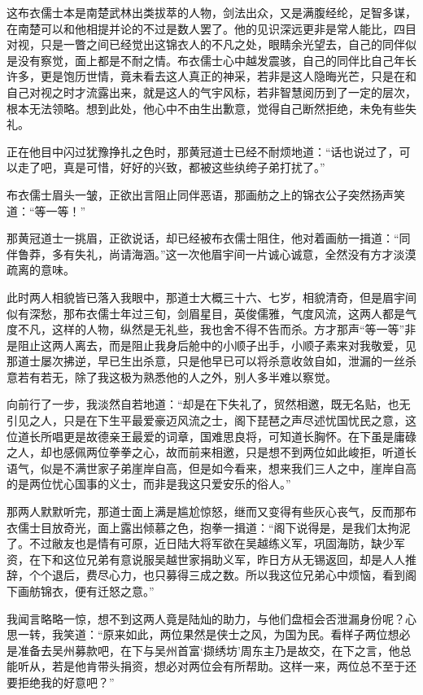 这布衣儒士本是南楚武林出类拔萃的人物，剑法出众，又是满腹经纶，足智多谋，在南楚可以和他相提并论的不过是数人罢了。他的见识深远更非是常人能比，四目对视，只是一瞥之间已经觉出这锦衣人的不凡之处，眼睛余光望去，自己的同伴似是没有察觉，面上都是不耐之情。布衣儒士心中越发震骇，自己的同伴比自己年长许多，更是饱历世情，竟未看去这人真正的神采，若非是这人隐晦光芒，只是在和自己对视之时才流露出来，就是这人的气宇风标，若非智慧阅历到了一定的层次，根本无法领略。想到此处，他心中不由生出歉意，觉得自己断然拒绝，未免有些失礼。

正在他目中闪过犹豫挣扎之色时，那黄冠道士已经不耐烦地道：“话也说过了，可以走了吧，真是可惜，好好的兴致，都被这些纨绔子弟打扰了。”

布衣儒士眉头一皱，正欲出言阻止同伴恶语，那画舫之上的锦衣公子突然扬声笑道：“等一等！”

那黄冠道士一挑眉，正欲说话，却已经被布衣儒士阻住，他对着画舫一揖道：“同伴鲁莽，多有失礼，尚请海涵。”这一次他眉宇间一片诚心诚意，全然没有方才淡漠疏离的意味。

此时两人相貌皆已落入我眼中，那道士大概三十六、七岁，相貌清奇，但是眉宇间似有深愁，那布衣儒士年过三旬，剑眉星目，英俊儒雅，气度风流，这两人都是气度不凡，这样的人物，纵然是无礼些，我也舍不得不告而杀。方才那声“等一等”非是阻止这两人离去，而是阻止我身后舱中的小顺子出手，小顺子素来对我敬爱，见那道士屡次拂逆，早已生出杀意，只是他早已可以将杀意收敛自如，泄漏的一丝杀意若有若无，除了我这极为熟悉他的人之外，别人多半难以察觉。

向前行了一步，我淡然自若地道：“却是在下失礼了，贸然相邀，既无名贴，也无引见之人，只是在下生平最爱豪迈风流之士，阁下琵琶之声尽述忧国忧民之意，这位道长所唱更是故德亲王最爱的词章，国难思良将，可知道长胸怀。在下虽是庸碌之人，却也感佩两位拳拳之心，故而前来相邀，只是想不到两位如此峻拒，听道长语气，似是不满世家子弟崖岸自高，但是如今看来，想来我们三人之中，崖岸自高的是两位忧心国事的义士，而非是我这只爱安乐的俗人。”

那两人默默听完，那道士面上满是尴尬惊怒，继而又变得有些灰心丧气，反而那布衣儒士目放奇光，面上露出倾慕之色，抱拳一揖道：“阁下说得是，是我们太拘泥了。不过敝友也是情有可原，近日陆大将军欲在吴越练义军，巩固海防，缺少军资，在下和这位兄弟有意说服吴越世家捐助义军，昨日方从无锡返回，却是人人推辞，个个退后，费尽心力，也只募得三成之数。所以我这位兄弟心中烦恼，看到阁下画舫锦衣，便有迁怒之意。”

我闻言略略一惊，想不到这两人竟是陆灿的助力，与他们盘桓会否泄漏身份呢？心思一转，我笑道：“原来如此，两位果然是侠士之风，为国为民。看样子两位想必是准备去吴州募款吧，在下与吴州首富‘撷绣坊’周东主乃是故交，在下之言，他总能听从，若是他肯带头捐资，想必对两位会有所帮助。这样一来，两位总不至于还要拒绝我的好意吧？”

